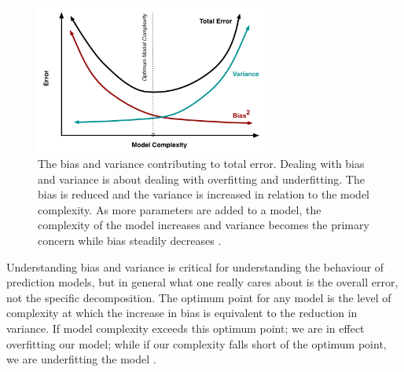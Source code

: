 \begin{figure}[H]
  \centering
    \includegraphics[width=0.7\textwidth]{images/biasvariance.png}
    \caption{The bias and variance contributing to total error. Dealing with bias and variance is about dealing with overfitting and underfitting. The bias is reduced and the variance is increased in relation to the model complexity. As more parameters are added to a model, the complexity of the model increases and variance becomes the primary concern while bias steadily decreases \citep{fortmann2012understanding}.}  
\end{figure}

Understanding bias and variance is critical for understanding the behaviour of prediction models, but in general what one really cares about is the overall error, not the specific decomposition. The optimum point for any model is the level of complexity at which the increase in bias is equivalent to the reduction in variance. If model complexity exceeds this optimum point; we are in effect overfitting our model; while if our complexity falls short of the optimum point, we are underfitting the model \citep{fortmann2012understanding}.









